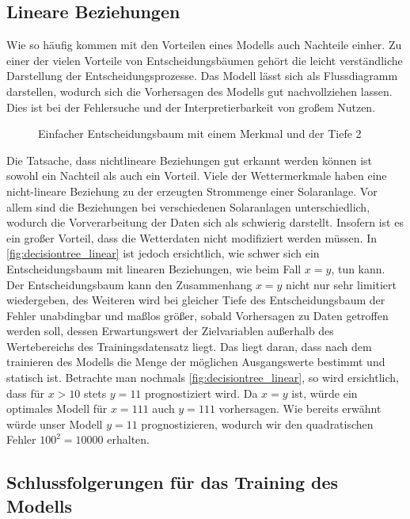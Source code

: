 \documentclass[12pt, a4paper]{article}
\begin{document}

\subsection{Lineare Beziehungen}

Wie so häufig kommen mit den Vorteilen eines Modells auch Nachteile einher. Zu einer der vielen Vorteile von Entscheidungsbäumen gehört die leicht verständliche Darstellung der Entscheidungsprozesse. Das Modell lässt sich als Flussdiagramm darstellen, wodurch sich die Vorhersagen des Modells gut nachvollziehen lassen. Dies ist bei der Fehlersuche und der Interpretierbarkeit von großem Nutzen.

\begin{figure}
\centering
\def\svgwidth{350pt}

\caption{Einfacher Entscheidungsbaum mit einem Merkmal und der Tiefe 2}
\label{fig:decisiontree_linear}
\end {figure}

Die Tatsache, dass nichtlineare Beziehungen gut erkannt werden können ist sowohl ein Nachteil als auch ein Vorteil. Viele der Wettermerkmale haben eine nicht-lineare Beziehung zu der erzeugten Strommenge einer Solaranlage. Vor allem sind die Beziehungen bei verschiedenen Solaranlagen unterschiedlich, wodurch die Vorverarbeitung der Daten sich als schwierig darstellt. Insofern ist es ein großer Vorteil, dass die Wetterdaten nicht modifiziert werden müssen. In \autoref{fig:decisiontree_linear} ist jedoch ersichtlich, wie schwer sich ein Entscheidungsbaum mit linearen Beziehungen, wie beim Fall $x=y$, tun kann. Der Entscheidungsbaum kann den Zusammenhang $x=y$ nicht nur sehr limitiert wiedergeben, des Weiteren wird bei gleicher Tiefe des Entscheidungsbaum der Fehler  unabdingbar und maßlos größer, sobald Vorhersagen zu Daten getroffen werden soll, dessen Erwartungswert der Zielvariablen außerhalb des Wertebereichs des Trainingsdatensatz liegt. Das liegt daran, dass nach dem trainieren des Modells die Menge der möglichen Ausgangswerte bestimmt und statisch ist. Betrachte man nochmals \autoref{fig:decisiontree_linear}, so wird ersichtlich, dass für $x>10$ stets $y=11$ prognostiziert wird. Da $x=y$ ist, würde ein optimales Modell für $x=111$ auch $y=111$ vorhersagen. Wie bereits erwähnt würde unser Modell $y=11$ prognostizieren, wodurch wir den quadratischen Fehler $100^{2}=10000$ erhalten. 

\subsection{Schlussfolgerungen für das Training des Modells}
\end{document}
